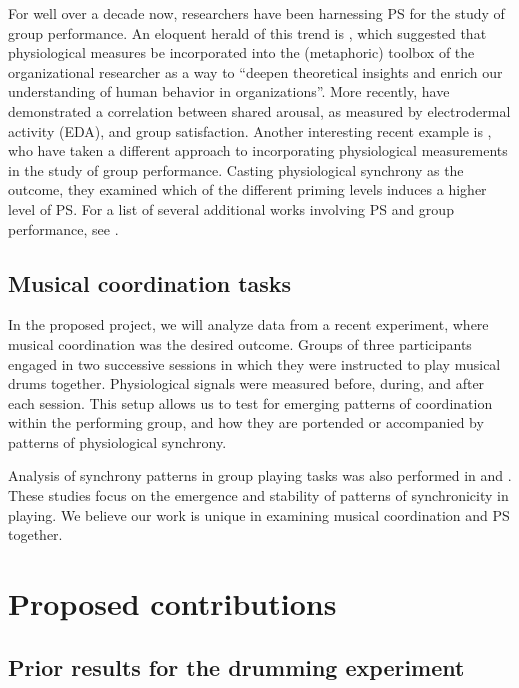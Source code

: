 \documentclass[a4paper, 11pt]{report}      %
\begin{document}
For well over a decade now, researchers have been harnessing PS for the study of group performance. An eloquent herald of this trend is \citet{akinola2010measuring}, which suggested that physiological measures be incorporated into the (metaphoric) toolbox of the organizational researcher as a way to \enquote{deepen theoretical insights and enrich our understanding of human behavior in organizations}. More recently,  \citet{chikersal2017deep} have demonstrated a correlation between shared arousal, as measured by electrodermal activity (EDA), and group satisfaction. Another interesting recent example is \citet{danyluck2018intergroup}, who have taken a different approach to incorporating physiological measurements in the study of group performance. Casting physiological synchrony as the outcome, they examined which of the different priming levels induces a higher level of PS. For a list of several additional works involving PS and group performance, see \citet{jar202physiological} .

\section{Musical coordination tasks}
In the proposed project, we will analyze data from a recent experiment, where musical coordination was the desired outcome. Groups of three participants engaged in two successive sessions in which they were instructed to play musical drums together. Physiological signals were measured before, during, and after each session\footnotemark. 
This setup allows us to test for emerging patterns of coordination within the performing group, and how they are portended or accompanied by patterns of physiological synchrony.

Analysis of synchrony patterns in group playing tasks was also performed in  \cite{abp2017symmetry} and \cite{shahal2020synchronization}. These studies focus on the emergence and stability of patterns of synchronicity in playing. We believe our work is unique in examining musical coordination and PS together.

\chapter{Proposed contributions}

\section{Prior results for the drumming experiment}
\end{document}
